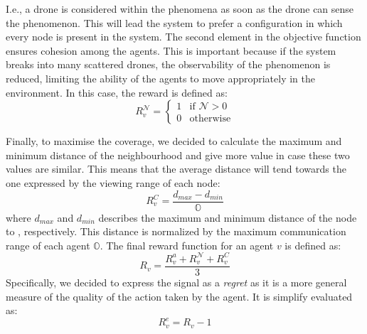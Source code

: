 \documentclass[conference]{IEEEtran}
\begin{document}
 I.e., a drone is considered within the phenomena as soon as the drone can sense the phenomenon.
This will lead the system to prefer a configuration in which every node is present in the system. 
%
The second element in the objective function ensures cohesion among the agents. This is important because if the system breaks into many scattered drones, the observability of the phenomenon is reduced, limiting the ability of the agents to move appropriately in the environment.
 In this case, the reward is defined as:
 \begin{equation*}
 R^{\mathcal{N}}_{v} = \begin{cases}
  1 & \text{if } \mathcal{N} > 0 \\
  0 & \text{otherwise} 
 \end{cases}
 \end{equation*}
 
 Finally, to maximise the coverage, 
  we decided to calculate the maximum and minimum distance of the neighbourhood and give more value in case these two values are similar. 
%
This means that the average distance will tend towards the one expressed by the viewing range of each node:
% 
\begin{equation*}
R^{C}_{v} = \frac{d_{max} - d_{min}}{\mathbb{O}}
\end{equation*}
where 
$d_{max}$ and $d_{min}$ describes the maximum and minimum distance of the node to , respectively. This distance is normalized by the maximum communication range of each agent $\mathbb{O}$.
The final reward function for an agent $v$ is defined as:
\begin{equation*}
R_{v} = \frac{R^a_{v} + R^{\mathcal{N}}_{v} + R^{C}_{v}}{3}
\end{equation*}
Specifically, we decided to express the signal as a \emph{regret}
  as it is a more general measure of the quality of the action taken by the agent.
It is simplify evaluated as:
\begin{equation*}
R^e_{v} = R_v - 1
\end{equation*}
%

\end{document}

